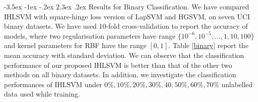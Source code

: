 \documentclass[12pt,a4paper,oneside,english]{report}
\makeatletter
\renewcommand\subsubsection{\@startsection {subsubsection}{1}{\z@}%
                                   {-3.5ex \@plus -1ex \@minus -.2ex}%
                                   {2.3ex \@plus.2ex}%
                                   {\centering\normalfont\large\bfseries}}
\makeatother
\begin{document}
\subsubsection{Results for Binary Classification.}
 We have compared IHLSVM with square-hinge loss version of LapSVM and HGSVM, on seven  UCI binary datasets. We have used 10-fold cross-validation to report the accuracy of models, where two regularisation parameters have range \( \{10^{-6},10^{-5},...,1,10,100\} \) and kernel parameters for RBF have the range \([0,1]\).  Table  \ref{binary} %
report the mean accuracy with standard deviation. We can observe that the classification performance of our proposed IHLSVM is better than that of the other two methods on all binary datasets. In addition, we investigate the classification performances of IHLSVM under \(0\%, 10 \%, 20 \%, 30 \%, 40, 50 \%, 60 \%, 70 \% \) unlabelled data used while training.

\end{document}
